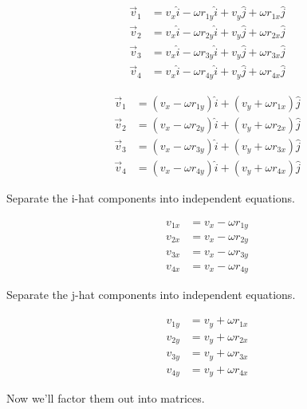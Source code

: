 \begin{align*}
  \vec{v}_1 &= v_x \hat{i} - \omega r_{1y} \hat{i} +
    v_y \hat{j} + \omega r_{1x} \hat{j} \\
  \vec{v}_2 &= v_x \hat{i} - \omega r_{2y} \hat{i} +
    v_y \hat{j} + \omega r_{2x} \hat{j} \\
  \vec{v}_3 &= v_x \hat{i} - \omega r_{3y} \hat{i} +
    v_y \hat{j} + \omega r_{3x} \hat{j} \\
  \vec{v}_4 &= v_x \hat{i} - \omega r_{4y} \hat{i} +
    v_y \hat{j} + \omega r_{4x} \hat{j}
\end{align*}

\begin{align*}
  \vec{v}_1 &= (v_x - \omega r_{1y}) \hat{i} + (v_y + \omega r_{1x}) \hat{j} \\
  \vec{v}_2 &= (v_x - \omega r_{2y}) \hat{i} + (v_y + \omega r_{2x}) \hat{j} \\
  \vec{v}_3 &= (v_x - \omega r_{3y}) \hat{i} + (v_y + \omega r_{3x}) \hat{j} \\
  \vec{v}_4 &= (v_x - \omega r_{4y}) \hat{i} + (v_y + \omega r_{4x}) \hat{j}
\end{align*}

Separate the i-hat components into independent equations.

\begin{align*}
  v_{1x} &= v_x - \omega r_{1y} \\
  v_{2x} &= v_x - \omega r_{2y} \\
  v_{3x} &= v_x - \omega r_{3y} \\
  v_{4x} &= v_x - \omega r_{4y}
\end{align*}

Separate the j-hat components into independent equations.

\begin{align*}
  v_{1y} &= v_y + \omega r_{1x} \\
  v_{2y} &= v_y + \omega r_{2x} \\
  v_{3y} &= v_y + \omega r_{3x} \\
  v_{4y} &= v_y + \omega r_{4x}
\end{align*}

Now we'll factor them out into matrices.


